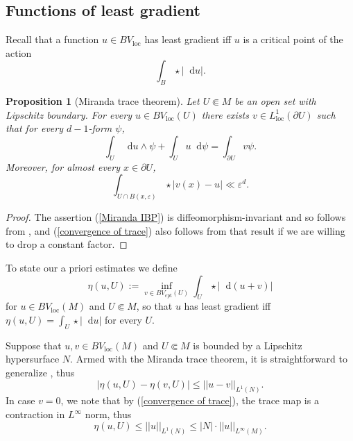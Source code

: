 \documentclass[reqno,10pt]{amsart}
\newcommand*\dif{\mathop{}\!\mathrm{d}}
\newcommand{\loc}{\mathrm{loc}}
\newcommand{\cpt}{\mathrm{cpt}}
\newtheorem{proposition}[theorem]{Proposition}
\theoremstyle{definition}
\numberwithin{equation}{section}
\begin{document}

\subsection{Functions of least gradient}\label{LeastGradientFunctions}
Recall that a function $u \in BV_\loc$ has least gradient iff $u$ is a critical point of the action
$$\int_B \star |\dif u|.$$

\begin{proposition}[Miranda trace theorem]\label{traces}
Let $U \Subset M$ be an open set with Lipschitz boundary.
For every $u \in BV_\loc(U)$ there exists $v \in L^1_\loc(\partial U)$ such that for every $d-1$-form $\psi$,
\begin{equation}\label{Miranda IBP}
\int_U \dif u \wedge \psi + \int_U u \dif \psi = \int_{\partial U} v\psi.
\end{equation}
Moreover, for almost every $x \in \partial U$,
\begin{equation}\label{convergence of trace}
\int_{U \cap B(x, \varepsilon)} \star |v(x) - u| \ll \varepsilon^d.
\end{equation}
\end{proposition}
\begin{proof}
The assertion (\ref{Miranda IBP}) is diffeomorphism-invariant and so follows from \cite[Teorema 1]{Miranda67}, and (\ref{convergence of trace}) also follows from that result if we are willing to drop a constant factor.
\end{proof}

To state our a priori estimates we define
$$\eta(u, U) := \inf_{v \in BV_\cpt(U)} \int_U \star |\dif(u + v)|$$
for $u \in BV_\loc(M)$ and $U \Subset M$, so that $u$ has least gradient iff $\eta(u, U) = \int_U \star |\dif u|$ for every $U$.

Suppose that $u, v \in BV_\loc(M)$ and $U \Subset M$ is bounded by a Lipschitz hypersurface $N$. Armed with the Miranda trace theorem, it is straightforward to generalize \cite[Lemma 5.6]{Giusti77}, thus
\begin{equation}
|\eta(u, U) - \eta(v, U)| \leq ||u - v||_{L^1(N)}. \label{a priori estimate 1}
\end{equation}
In case $v = 0$, we note that by (\ref{convergence of trace}), the trace map is a contraction in $L^\infty$ norm, thus
\begin{equation}
\eta(u, U) \leq ||u||_{L^1(N)} \leq |N| \cdot ||u||_{L^\infty(M)}. \label{a priori estimate 2}
\end{equation}
\end{document}
